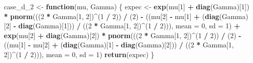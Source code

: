 \documentclass[
]{article}
\newenvironment{Shaded}{\begin{snugshade}}{\end{snugshade}}
\newcommand{\AttributeTok}[1]{\textcolor[rgb]{0.13,0.29,0.53}{#1}}
\newcommand{\ControlFlowTok}[1]{\textcolor[rgb]{0.13,0.29,0.53}{\textbf{#1}}}
\newcommand{\DecValTok}[1]{\textcolor[rgb]{0.00,0.00,0.81}{#1}}
\newcommand{\FunctionTok}[1]{\textcolor[rgb]{0.13,0.29,0.53}{\textbf{#1}}}
\newcommand{\NormalTok}[1]{#1}
\newcommand{\OtherTok}[1]{\textcolor[rgb]{0.56,0.35,0.01}{#1}}
\newcommand{\SpecialCharTok}[1]{\textcolor[rgb]{0.81,0.36,0.00}{\textbf{#1}}}
\begin{document}
\begin{Shaded}
\begin{Highlighting}[]
\NormalTok{case\_d\_2 }\OtherTok{\textless{}{-}} \ControlFlowTok{function}\NormalTok{(mu, Gamma) \{}
\NormalTok{  expec }\OtherTok{\textless{}{-}} \FunctionTok{exp}\NormalTok{(mu[}\DecValTok{1}\NormalTok{] }\SpecialCharTok{+} \FunctionTok{diag}\NormalTok{(Gamma)[}\DecValTok{1}\NormalTok{]) }\SpecialCharTok{*} \FunctionTok{pnorm}\NormalTok{(((}\DecValTok{2} \SpecialCharTok{*}\NormalTok{ Gamma[}\DecValTok{1}\NormalTok{, }\DecValTok{2}\NormalTok{])}\SpecialCharTok{\^{}}\NormalTok{(}\DecValTok{1} \SpecialCharTok{/} \DecValTok{2}\NormalTok{)) }\SpecialCharTok{/}\NormalTok{ (}\DecValTok{2}\NormalTok{) }\SpecialCharTok{{-}}\NormalTok{ ((mu[}\DecValTok{2}\NormalTok{] }\SpecialCharTok{{-}}\NormalTok{ mu[}\DecValTok{1}\NormalTok{] }\SpecialCharTok{+}\NormalTok{ (}\FunctionTok{diag}\NormalTok{(Gamma)[}\DecValTok{2}\NormalTok{] }\SpecialCharTok{{-}} \FunctionTok{diag}\NormalTok{(Gamma)[}\DecValTok{1}\NormalTok{])) }\SpecialCharTok{/}\NormalTok{ ((}\DecValTok{2} \SpecialCharTok{*}\NormalTok{ Gamma[}\DecValTok{1}\NormalTok{, }\DecValTok{2}\NormalTok{])}\SpecialCharTok{\^{}}\NormalTok{(}\DecValTok{1} \SpecialCharTok{/} \DecValTok{2}\NormalTok{))), }\AttributeTok{mean =} \DecValTok{0}\NormalTok{, }\AttributeTok{sd =} \DecValTok{1}\NormalTok{) }\SpecialCharTok{+} \FunctionTok{exp}\NormalTok{(mu[}\DecValTok{2}\NormalTok{] }\SpecialCharTok{+} \FunctionTok{diag}\NormalTok{(Gamma)[}\DecValTok{2}\NormalTok{]) }\SpecialCharTok{*} \FunctionTok{pnorm}\NormalTok{(((}\DecValTok{2} \SpecialCharTok{*}\NormalTok{ Gamma[}\DecValTok{1}\NormalTok{, }\DecValTok{2}\NormalTok{])}\SpecialCharTok{\^{}}\NormalTok{(}\DecValTok{1} \SpecialCharTok{/} \DecValTok{2}\NormalTok{)) }\SpecialCharTok{/}\NormalTok{ (}\DecValTok{2}\NormalTok{) }\SpecialCharTok{{-}}\NormalTok{ ((mu[}\DecValTok{1}\NormalTok{] }\SpecialCharTok{{-}}\NormalTok{ mu[}\DecValTok{2}\NormalTok{] }\SpecialCharTok{+}\NormalTok{ (}\FunctionTok{diag}\NormalTok{(Gamma)[}\DecValTok{1}\NormalTok{] }\SpecialCharTok{{-}} \FunctionTok{diag}\NormalTok{(Gamma)[}\DecValTok{2}\NormalTok{])) }\SpecialCharTok{/}\NormalTok{ ((}\DecValTok{2} \SpecialCharTok{*}\NormalTok{ Gamma[}\DecValTok{1}\NormalTok{, }\DecValTok{2}\NormalTok{])}\SpecialCharTok{\^{}}\NormalTok{(}\DecValTok{1} \SpecialCharTok{/} \DecValTok{2}\NormalTok{))), }\AttributeTok{mean =} \DecValTok{0}\NormalTok{, }\AttributeTok{sd =} \DecValTok{1}\NormalTok{)}
  \FunctionTok{return}\NormalTok{(expec)}
\NormalTok{\}}
\end{Highlighting}
\end{Shaded}
\end{document}
